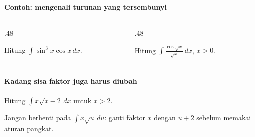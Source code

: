 \documentclass{../../kalkulus-ppt}
\begin{document}
\begin{frame}
\frametitle{\insertsection}
\framesubtitle{Contoh: mengenali turunan yang tersembunyi}
\begin{columns}[c]
\begin{column}{.48\textwidth}

\begin{contoh}
Hitung $\displaystyle\int\sin^3x\cos x\,dx$.
\end{contoh}
\end{column}
\begin{column}{.48\textwidth}

\begin{contoh}
Hitung $\displaystyle\int\frac{\cos\sqrt{x}}{\sqrt{x}}\,dx$, $x>0$.
\end{contoh}
\end{column}
\end{columns}
\end{frame}

\begin{frame}
\frametitle{\insertsection}
\framesubtitle{Kadang sisa faktor juga harus diubah}

\begin{contoh}
Hitung $\displaystyle\int x\sqrt{x-2}\,dx$ untuk $x>2$.
\end{contoh}
Jangan berhenti pada $\int x\sqrt{u}\,du$: ganti faktor $x$ dengan $u+2$ sebelum memakai aturan pangkat.
\end{frame}
\end{document}
